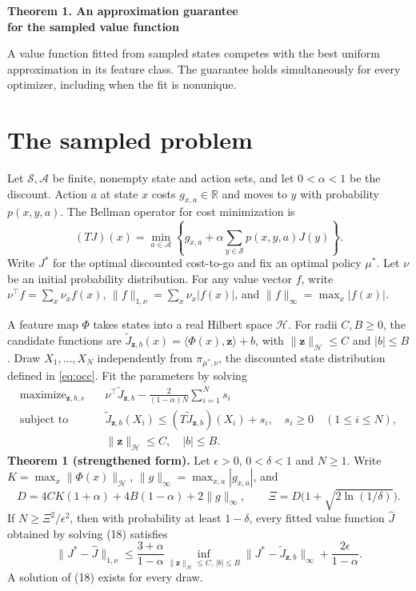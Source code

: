 \documentclass[12pt,a4paper]{article}
\newcommand{\R}{\mathbb R}
\begin{document}
{\LARGE\bfseries Theorem 1. An approximation guarantee\\[2pt] for the sampled value function\par}
\medskip
A value function fitted from sampled states competes with the best uniform
approximation in its feature class. The guarantee holds simultaneously for
every optimizer, including when the fit is nonunique.

\section*{The sampled problem}
Let \(\mathcal S,\mathcal A\) be finite, nonempty state and action sets,
and let \(0<\alpha<1\) be the discount. Action \(a\) at state \(x\) costs
\(g_{x,a}\in\R\) and moves to \(y\) with probability \(p(x,y,a)\).
The Bellman operator for cost minimization is
\[
 (TJ)(x)=\min_{a\in\mathcal A}
   \left\{g_{x,a}+\alpha\sum_{y\in\mathcal S}p(x,y,a)J(y)\right\}.
\]
Write \(J^*\) for the optimal discounted cost-to-go and fix an optimal policy
\(\mu^*\). Let \(\nu\) be an initial probability distribution. For any
value vector \(f\), write \(\nu^\top f=\sum_x\nu_x f(x)\),
\(\|f\|_{1,\nu}=\sum_x\nu_x|f(x)|\), and \(\|f\|_\infty=\max_x|f(x)|\).

A feature map \(\Phi\) takes states into a real Hilbert space \(\mathcal H\).
For radii \(C,B\ge0\), the candidate functions are
\(\widetilde J_{\mathbf z,b}(x)=\langle\Phi(x),\mathbf z\rangle+b\),
with \(\|\mathbf z\|_{\mathcal H}\le C\) and \(|b|\le B\).
Draw \(X_1,\ldots,X_N\) independently from \(\pi_{\mu^*,\nu}\), the
discounted state distribution defined in \eqref{eq:occ}. Fit the parameters
by solving
\[
\begin{aligned}
 \operatorname{maximize}_{\mathbf z,b,s}\quad&
 \nu^\top\widetilde J_{\mathbf z,b}
       -\frac{2}{(1-\alpha)N}\sum_{i=1}^N s_i\\
 \text{subject to}\quad&
 \widetilde J_{\mathbf z,b}(X_i)\le (T\widetilde J_{\mathbf z,b})(X_i)+s_i,
 \quad s_i\ge0 \quad (1\le i\le N),\\
 &\|\mathbf z\|_{\mathcal H}\le C,\quad |b|\le B .
\end{aligned}
\tag{18}
\]
\textbf{Theorem 1 (strengthened form).} Let \(\epsilon>0\), \(0<\delta<1\) and \(N\ge1\).
Write \(K=\max_x\|\Phi(x)\|_{\mathcal H}\), \(\|g\|_\infty=\max_{x,a}|g_{x,a}|\), and
\[
 D=4CK(1+\alpha)+4B(1-\alpha)+2\|g\|_\infty,\qquad
 \Xi=D\bigl(1+\sqrt{2\ln(1/\delta)}\bigr).
\]
If \(N\ge\Xi^2/\epsilon^2\), then with probability at least \(1-\delta\),
every fitted value function \(\widehat J\) obtained by solving (18) satisfies
\begin{equation}
 \|J^*-\widehat J\|_{1,\nu}
 \le \frac{3+\alpha}{1-\alpha}
       \inf_{\|\mathbf z\|_{\mathcal H}\le C,\,|b|\le B}
       \|J^*-\widetilde J_{\mathbf z,b}\|_\infty
       +\frac{2\epsilon}{1-\alpha}.
 \tag{19$'$}\label{eq:main}
\end{equation}
A solution of (18) exists for every draw.
\end{document}
